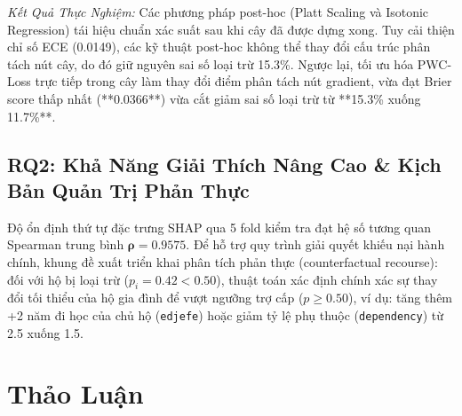 \documentclass[conference]{IEEEtran}
\begin{document}
\textit{Kết Quả Thực Nghiệm:} Các phương pháp post-hoc (Platt Scaling và Isotonic Regression) tái hiệu chuẩn xác suất sau khi cây đã được dựng xong. Tuy cải thiện chỉ số ECE (0.0149), các kỹ thuật post-hoc không thể thay đổi cấu trúc phân tách nút cây, do đó giữ nguyên sai số loại trừ 15.3\%. Ngược lại, tối ưu hóa PWC-Loss trực tiếp trong cây làm thay đổi điểm phân tách nút gradient, vừa đạt Brier score thấp nhất (**0.0366**) vừa cắt giảm sai số loại trừ từ **15.3\% xuống 11.7\%**.

\subsection{RQ2: Khả Năng Giải Thích Nâng Cao & Kịch Bản Quản Trị Phản Thực}

Độ ổn định thứ tự đặc trưng SHAP qua 5 fold kiểm tra đạt hệ số tương quan Spearman trung bình $\mathbf{\rho = 0.9575}$. Để hỗ trợ quy trình giải quyết khiếu nại hành chính, khung đề xuất triển khai phân tích phản thực (counterfactual recourse): đối với hộ bị loại trừ ($p_i = 0.42 < 0.50$), thuật toán xác định chính xác sự thay đổi tối thiểu của hộ gia đình để vượt ngưỡng trợ cấp ($p \ge 0.50$), ví dụ: tăng thêm +2 năm đi học của chủ hộ (\texttt{edjefe}) hoặc giảm tỷ lệ phụ thuộc (\texttt{dependency}) từ 2.5 xuống 1.5.

\section{Thảo Luận}
\end{document}
